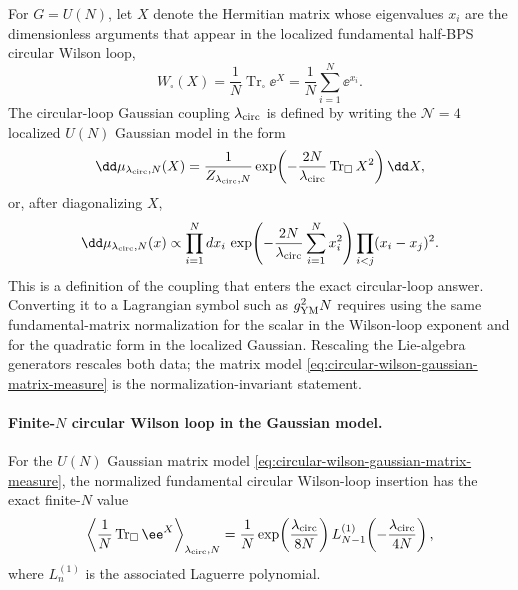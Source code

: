 \begin{definition}
\label{def:circular-wilson-loop-matrix-coupling}
For \(G=U(N)\), let \(X\) denote the Hermitian matrix whose eigenvalues
\(x_i\) are the dimensionless arguments that appear in the localized
fundamental half-BPS circular Wilson loop,
\begin{equation}
  W_{\square}(X)
  =
  \frac1N\operatorname{Tr}_{\square}\ee^{X}
  =
  \frac1N\sum_{i=1}^N\ee^{x_i}.
  \label{eq:localized-circular-wilson-insertion}
\end{equation}
The circular-loop Gaussian coupling \(\lambda_{\rm circ}\) is defined by
writing the \(\mathcal N=4\) localized \(U(N)\) Gaussian model in the form
\begin{equation}
  \dd\mu_{\lambda_{\rm circ},N}(X)
  =
  \frac1{Z_{\lambda_{\rm circ},N}}
  \exp\!\left(
    -\frac{2N}{\lambda_{\rm circ}}\operatorname{Tr}_{\square}X^2
  \right)\dd X ,
  \label{eq:circular-wilson-gaussian-matrix-measure}
\end{equation}
or, after diagonalizing \(X\),
\begin{equation}
  \dd\mu_{\lambda_{\rm circ},N}(x)
  \propto
  \prod_{i=1}^N dx_i\,
  \exp\!\left(
    -\frac{2N}{\lambda_{\rm circ}}\sum_{i=1}^Nx_i^2
  \right)
  \prod_{i<j}(x_i-x_j)^2 .
  \label{eq:circular-wilson-eigenvalue-measure}
\end{equation}
This is a definition of the coupling that enters the exact circular-loop
answer.  Converting it to a Lagrangian symbol such as \(g_{\rm YM}^2N\)
requires using the same fundamental-matrix normalization for the scalar in
the Wilson-loop exponent and for the quadratic form in the localized
Gaussian.  Rescaling the Lie-algebra generators rescales both data; the
matrix model \eqref{eq:circular-wilson-gaussian-matrix-measure} is the
normalization-invariant statement.
\end{definition}

\paragraph{Finite-\texorpdfstring{\(N\)}{N} circular Wilson loop in the Gaussian model.}
For the \(U(N)\) Gaussian matrix model
\eqref{eq:circular-wilson-gaussian-matrix-measure}, the normalized
fundamental circular Wilson-loop insertion has the exact finite-\(N\) value
\begin{equation}
  \left\langle
    \frac1N\operatorname{Tr}_{\square}\ee^X
  \right\rangle_{\lambda_{\rm circ},N}
  =
  \frac1N
  \exp\!\left(\frac{\lambda_{\rm circ}}{8N}\right)
  L_{N-1}^{(1)}
  \!\left(-\frac{\lambda_{\rm circ}}{4N}\right),
  \label{eq:finite-n-circular-wilson-laguerre}
\end{equation}
where \(L_n^{(1)}\) is the associated Laguerre polynomial.

